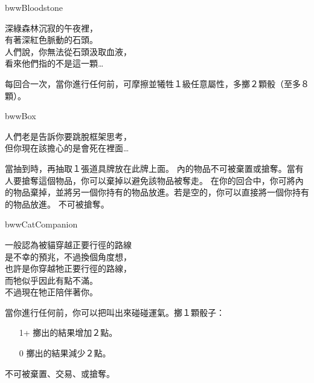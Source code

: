 %
\begin{OmenCard}{bww}{Bloodstone}{}
  \begin{CardStory}
    深綠森林沉寂的午夜裡，\\
    有著深紅色脈動的石頭。\\
    人們說，你無法從石頭汲取血液，\\
    看來他們指的不是這一顆…
  \end{CardStory}
  每回合一次，當你進行任何前，可摩擦\ThisName{}並犧牲１級任意屬性，多擲２顆骰（至多８顆）。\smallbreak
\end{OmenCard}%
\linebreak[0]%
\begin{OmenCard}{bww}{Box}{}
  \begin{CardStory}
    人們老是告訴你要跳脫框架思考，\\
    但你現在該擔心的是會死在裡面…
  \end{CardStory}
  當抽到\ThisName{}時，再抽取１張道具牌放在此牌上面。\smallbreak
  \ThisName{}內的物品不可被棄置或搶奪。當有人要搶奪這個物品，你可以棄掉\ThisName{}以避免該物品被奪走。\smallbreak
  在你的回合中，你可將\ThisName{}內的物品棄掉，並將另一個你持有的物品放進\ThisName{}。若\ThisName{}是空的，你可以直接將一個你持有的物品放進\ThisName{}。\smallbreak
  \ThisName{}不可被搶奪。\smallbreak
\end{OmenCard}%
\linebreak[0]%
\begin{OmenCard}{bww}{Cat}{Companion}
  \begin{CardStory}
    一般認為被貓穿越正要行徑的路線\\
    是不幸的預兆，不過換個角度想，\\
    也許是你穿越牠正要行徑的路線，\\
    而牠似乎因此有點不滿。\\
    不過現在牠正陪伴著你。
  \end{CardStory}
  當你進行任何前，你可以把\ThisName{}叫出來碰碰運氣。擲１顆骰子：
  \begin{itemize}
    \item[1+] 擲出的結果增加２點。
    \item[0] 擲出的結果減少２點。
  \end{itemize}
  \ThisName{}不可被棄置、交易、或搶奪。\smallbreak
\end{OmenCard}%
\linebreak[0]%

